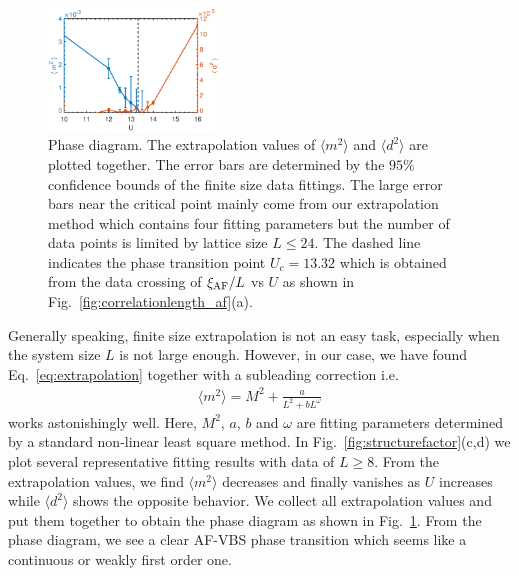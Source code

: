 \documentclass[twocolumn,superscriptaddress]{revtex4-1}
\begin{document}

\begin{figure}
  \includegraphics[width=0.4\textwidth]{phasediagram}
  \caption{\label{fig:phasediagram}Phase diagram. The extrapolation values of $\langle m^2 \rangle$ and $\langle d^2 \rangle$ are plotted together. The error bars are determined by the $95\%$ confidence bounds of the finite size data fittings. The large error bars near the critical point mainly come from our extrapolation method which contains four fitting parameters but the number of data points is limited by lattice size $L\le24$. The dashed line indicates the phase transition point $U_c=13.32$ which is obtained from the data crossing of $\xi_{\rm AF}/L$ vs $U$ as shown in Fig.~\ref{fig:correlationlength_af}(a).}
\end{figure}

Generally speaking, finite size extrapolation is not an easy task, especially when the system size $L$ is not large enough. However, in our case, we have found Eq.~\ref{eq:extrapolation} together with a subleading correction \cite{Sandvik2010a} i.e.
\begin{eqnarray}\label{eq:extrapolation_magic}
  \langle m^2 \rangle=M^2+\frac{a}{L^2+bL^\omega}
\end{eqnarray}
works astonishingly well. Here, $M^2$, $a$, $b$ and $\omega$ are fitting parameters determined by a standard non-linear least square method. 
In Fig.~\ref{fig:structurefactor}(c,d) we plot several representative fitting results with data of $L\ge8$. From the extrapolation values, we find $\langle m^2 \rangle$ decreases and finally vanishes as $U$ increases while $\langle d^2\rangle$ shows the opposite behavior. We collect all extrapolation values and put them together to obtain the phase diagram as shown in Fig.~\ref{fig:phasediagram}. From the phase diagram, we see a clear AF-VBS phase transition which seems like a continuous or weakly first order one.
\end{document}
